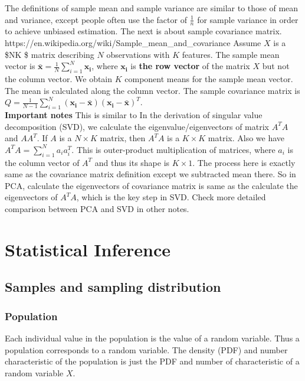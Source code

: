 \documentclass[11pt]{article}
\begin{document}
The definitions of sample mean and sample variance are similar to those
of mean and variance, except people often use the factor of
\(\frac{1}{n}\) for sample variance in order to achieve unbiased
estimation. The next is about sample covariance matrix.\\
https://en.wikipedia.org/wiki/Sample\_mean\_and\_covariance Assume \(X\)
is a \$N\times K \$ matrix describing \(N\) observations with \(K\)
features. The sample mean vector is
\(\bar{\mathbf{x}} = \frac{1}{N}\sum_{i=1}^N\mathbf{x_i}\), where
\(\mathbf{x_i}\) is \textbf{the row vector} of the matrix \(X\) but not
the column vector. We obtain \(K\) component means for the sample mean
vector. The mean is calculated along the column vector. The sample
covariance matrix is
\(Q = \frac{1}{N-1}\sum_{i=1}^N(\mathbf{x_i}-\mathbf{\bar{x}})(\mathbf{x_i}-\mathbf{\bar{x}})^T\).\\
\textbf{Important notes} This is similar to In the derivation of
singular value decomposition (SVD), we calculate the
eigenvalue/eigenvectors of matrix \(A^TA\) and \(AA^T\). If \(A\) is a
\(N\times K\) matrix, then \(A^TA\) is a \(K\times K\) matrix. Also we
have \(A^TA = \sum_{i=1}^N a_ia_i^T\). This is outer-product
multiplication of matrices, where \(a_i\) is the column vector of
\(A^T\) and thus its shape is \(K\times 1\). The process here is exactly
same as the covariance matrix definition except we subtracted mean
there. So in PCA, calculate the eigenvectors of covariance matrix is
same as the calculate the eigenvectors of \(A^TA\), which is the key
step in SVD. Check more detailed comparison between PCA and SVD in other
notes.

    \section{Statistical Inference}\label{statistical-inference}

\subsection{Samples and sampling
distribution}\label{samples-and-sampling-distribution}

\subsubsection{Population}\label{population}

Each individual value in the population is the value of a random
variable. Thus a population corresponds to a random variable. The
density (PDF) and number characteristic of the population is just the
PDF and number of characteristic of a random variable \(X\).
\end{document}
